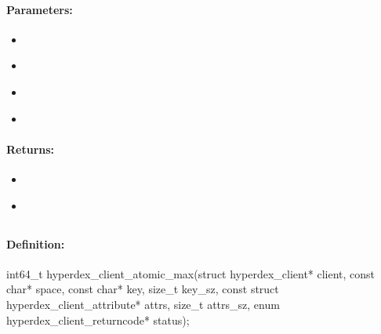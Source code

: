 \paragraph{Parameters:}
\begin{itemize}[noitemsep]
\item {}\\

\item {}\\

\item {}\\

\item {}\\

\end{itemize}

\paragraph{Returns:}
\begin{itemize}[noitemsep]
\item {}\\

\item {}\\

\end{itemize}

\pagebreak
\subsection{}
\label{api:c:atomic_max}


\paragraph{Definition:}
\begin{ccode}
int64_t hyperdex_client_atomic_max(struct hyperdex_client* client,
        const char* space,
        const char* key, size_t key_sz,
        const struct hyperdex_client_attribute* attrs, size_t attrs_sz,
        enum hyperdex_client_returncode* status);
\end{ccode}

